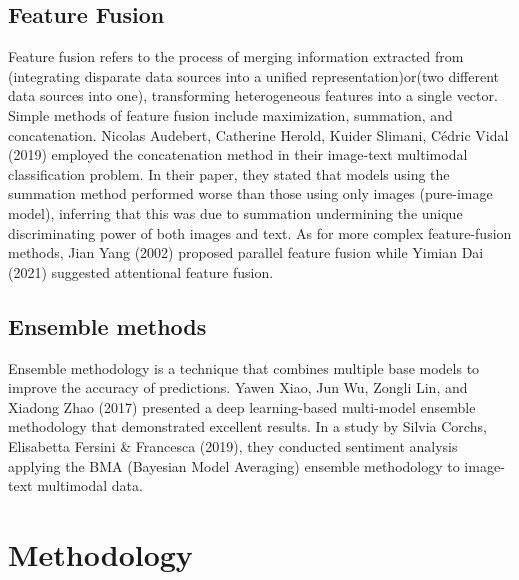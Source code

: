 \documentclass{article}
\begin{document}
\subsection{Feature Fusion}
Feature fusion refers to the process of merging information extracted from (integrating disparate data sources into a unified representation)or(two different data sources into one), transforming heterogeneous features into a single vector. Simple methods of feature fusion include maximization, summation, and concatenation. Nicolas Audebert, Catherine Herold, Kuider Slimani, Cédric Vidal (2019) employed the concatenation method in their image-text multimodal classification problem.\cite{audebert2020multimodal} In their paper, they stated that models using the summation method performed worse than those using only images (pure-image model), inferring that this was due to summation undermining the unique discriminating power of both images and text. As for more complex feature-fusion methods, Jian Yang (2002) proposed parallel feature fusion\cite{yang2003feature} while Yimian Dai (2021) suggested attentional feature fusion.\cite{dai2021attentional}


\subsection{Ensemble methods}
Ensemble methodology is a technique that combines multiple base models to improve the accuracy of predictions. Yawen Xiao, Jun Wu, Zongli Lin, and Xiadong Zhao (2017) presented a deep learning-based multi-model ensemble methodology that demonstrated excellent results.\cite{xiao2018deep} In a study by Silvia Corchs, Elisabetta Fersini \& Francesca (2019), they conducted sentiment analysis applying the BMA (Bayesian Model Averaging) ensemble methodology to image-text multimodal data.\cite{corchs2019ensemble}


\section{Methodology}
\end{document}
